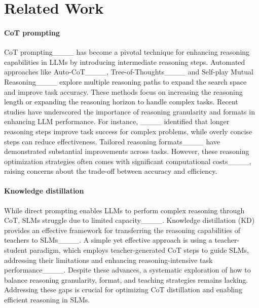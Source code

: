 \section{Related Work}
\paragraph{CoT prompting} CoT prompting____ has become a pivotal technique for enhancing reasoning capabilities in LLMs by introducing intermediate reasoning steps. Automated approaches like Auto-CoT____, Tree-of-Thoughts____ and Self-play Mutual Reasoning____ explore multiple reasoning paths to expand the search space and improve task accuracy. These methods focus on increasing the reasoning length or expanding the reasoning horizon to handle complex tasks. 
Recent studies have underscored the importance of reasoning granularity and formats in enhancing LLM performance. For instance, ____ identified that longer reasoning steps improve task success for complex problems, while overly concise steps can reduce effectiveness. Tailored reasoning formats____ have demonstrated substantial improvements across tasks. However, these reasoning optimization strategies often comes with significant computational costs____, raising concerns about the trade-off between accuracy and efficiency. 

\paragraph{Knowledge distillation} While direct prompting enables LLMs to perform complex reasoning through CoT, SLMs struggle due to limited capacity____. Knowledge distillation (KD) provides an effective framework for transferring the reasoning capabilities of teachers to SLMs____. A simple yet effective approach is using a teacher-student paradigm, which employs teacher-generated CoT steps to guide SLMs, addressing their limitations and enhancing reasoning-intensive task performance____. 
Despite these advances, a systematic exploration of how to balance reasoning granularity, format, and teaching strategies remains lacking. Addressing these gaps is crucial for optimizing CoT distillation and enabling efficient reasoning in SLMs.